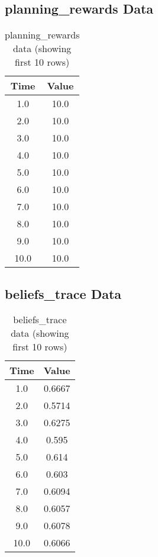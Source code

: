 \documentclass{article}
\begin{document}
\subsection{planning_rewards Data}
\begin{table}[h]
\centering
\begin{tabular}{cc}
\toprule
Time & Value \\
\midrule
1.0 & 10.0 \\
2.0 & 10.0 \\
3.0 & 10.0 \\
4.0 & 10.0 \\
5.0 & 10.0 \\
6.0 & 10.0 \\
7.0 & 10.0 \\
8.0 & 10.0 \\
9.0 & 10.0 \\
10.0 & 10.0 \\
\bottomrule
\end{tabular}
\caption{planning_rewards data (showing first 10 rows)}
\end{table}

\subsection{beliefs_trace Data}
\begin{table}[h]
\centering
\begin{tabular}{cc}
\toprule
Time & Value \\
\midrule
1.0 & 0.6667 \\
2.0 & 0.5714 \\
3.0 & 0.6275 \\
4.0 & 0.595 \\
5.0 & 0.614 \\
6.0 & 0.603 \\
7.0 & 0.6094 \\
8.0 & 0.6057 \\
9.0 & 0.6078 \\
10.0 & 0.6066 \\
\bottomrule
\end{tabular}
\caption{beliefs_trace data (showing first 10 rows)}
\end{table}
\end{document}
